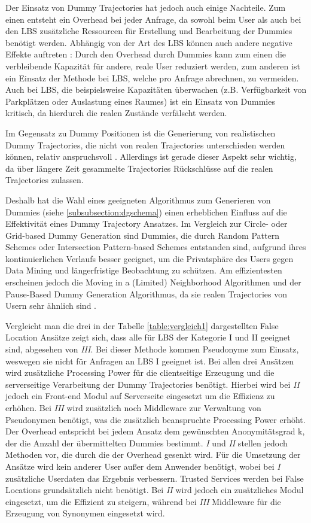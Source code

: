 Der Einsatz von Dummy Trajectories hat jedoch auch einige Nachteile. Zum einen entsteht ein Overhead bei jeder Anfrage, da sowohl beim User als auch bei den LBS zusätzliche Ressourcen für Erstellung und Bearbeitung der Dummies benötigt werden. Abhängig von der Art des LBS können auch andere negative Effekte auftreten \cite{Beresford2005}: Durch den Overhead durch Dummies kann zum einen die verbleibende Kapazität für andere, reale User reduziert werden, zum anderen ist ein Einsatz der Methode bei LBS, welche pro Anfrage abrechnen, zu vermeiden. Auch bei LBS, die beispielsweise Kapazitäten überwachen (z.B. Verfügbarkeit von Parkplätzen oder Auslastung eines Raumes) ist ein Einsatz von Dummies kritisch, da hierdurch die realen Zustände verfälscht werden.

Im Gegensatz zu Dummy Positionen ist die Generierung von realistischen Dummy Trajectories, die nicht von realen Trajectories unterschieden werden können, relativ anspruchsvoll \cite{Beresford2003}. Allerdings ist gerade dieser Aspekt sehr wichtig, da über längere Zeit gesammelte Trajectories Rückschlüsse auf die realen Trajectories zulassen. 

Deshalb hat die Wahl eines geeigneten Algorithmus zum Generieren von Dummies (siehe \ref{subsubsection:dgschema}) einen erheblichen Einfluss auf die Effektivität eines Dummy Trajectory Ansatzes. Im Vergleich zur Circle- oder Grid-based Dummy Generation sind Dummies, die durch Random Pattern Schemes oder Intersection Pattern-based Schemes entstanden sind, aufgrund ihres kontinuierlichen Verlaufs besser geeignet, um die Privatsphäre des Users gegen Data Mining und längerfristige Beobachtung zu schützen. Am effizientesten erscheinen jedoch die Moving in a (Limited) Neighborhood Algorithmen und der Pause-Based Dummy Generation Algorithmus, da sie realen Trajectories von Usern sehr ähnlich sind \cite{Kukkapalli2012}. 

Vergleicht man die drei in der Tabelle \ref{table:vergleich1} dargestellten False Location Ansätze zeigt sich, dass alle für LBS der Kategorie I und II geeignet sind, abgesehen von \textit{III}. Bei dieser Methode kommen Pseudonyme zum Einsatz, weswegen sie nicht für Anfragen an LBS I geeignet ist. Bei allen drei Ansätzen wird zusätzliche Processing Power für die clientseitige Erzeugung und die serverseitige Verarbeitung der Dummy Trajectories benötigt. Hierbei wird bei \textit{II} jedoch ein Front-end Modul auf Serverseite eingesetzt um die Effizienz zu erhöhen. Bei \textit{III} wird zusätzlich noch Middleware zur Verwaltung von Pseudonymen benötigt, was die zusätzlich beanspruchte Processing Power erhöht. Der Overhead entspricht bei jedem Ansatz dem gewünschten Anonymitätsgrad k, der die Anzahl der übermittelten Dummies bestimmt. \textit{I} und \textit{II} stellen jedoch Methoden vor, die durch die der Overhead gesenkt wird. Für die Umsetzung der Ansätze wird kein anderer User außer dem Anwender benötigt, wobei bei \textit{I} zusätzliche Userdaten das Ergebnis verbessern. Trusted Services werden bei False Locations grundsätzlich nicht benötigt. Bei \textit{II} wird jedoch ein zusätzliches Modul eingesetzt, um die Effizient zu steigern, während bei \textit{III} Middleware für die Erzeugung von Synonymen eingesetzt wird.